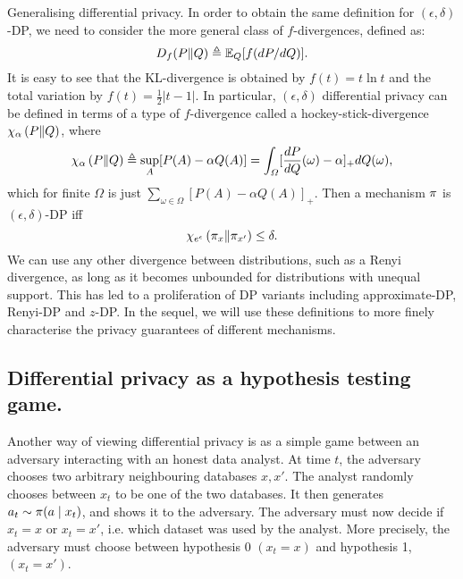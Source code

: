 {\begin{theoryblock}{Generalising differential privacy.}
    In order to obtain the same definition for $(\epsilon, \delta)$-DP, we need to consider the more general class of $f$-divergences, defined as:
    \begin{equation}
      \label{eq:f-divergence}
      D_f(P\|Q) \mathrel{\triangleq} \mathop{\mbox{\ensuremath{\mathbb{E}}}}\nolimits_Q[f(dP/dQ)].
    \end{equation}
    It is easy to see that the KL-divergence is obtained by
    $f(t) = t \ln t$ and the total variation by
    $f(t) = \frac{1}{2}|t - 1|$.  In particular, $(\epsilon, \delta)$
    differential privacy can be defined in terms of a type of
    $f$-divergence called a hockey-stick-divergence
    $\chi_{\alpha}\left(P \middle\| Q \right)$, where
    \[
      \chi_{\alpha}\left(P \middle\| Q \right) \mathrel{\triangleq} \sup_A [P(A) - \alpha Q(A)] = \int_\Omega [\frac{d P}{d Q} (\omega) - \alpha]_+ dQ(\omega),
    \]
    which for finite $\Omega$ is just $\sum_{\omega \in \Omega} [P(A) - \alpha Q(A)]_+$.
Then a mechanism $\pi$ is $(\epsilon, \delta)$-DP iff
    \begin{equation}
      \chi_{e^\epsilon}\left(\pi_x \middle\| \pi_{x'} \right)\leq \delta.
      \label{eq:divergence-DP}
    \end{equation}
    We can use any other divergence between distributions, such as a Renyi divergence, as long as it becomes unbounded for distributions with unequal support.  This has led to a proliferation of DP variants including approximate-DP, Renyi-DP and $z$-DP. In the sequel, we will use these definitions to more finely characterise the privacy guarantees of different mechanisms.
  \end{theoryblock}

}

\subsection{Differential privacy as a hypothesis testing game.}

Another way of viewing differential privacy is as a simple game
between an adversary interacting with an honest data analyst. At time
$t$, the adversary chooses two arbitrary neighbouring databases
$x, x'$. The analyst randomly chooses between $x_t$ to be one of
the two databases. It then generates $a_t \sim \pi(a \mid x_t)$,
and shows it to the adversary. The adversary must now decide if
$x_t = x$ or $x_t = x'$, i.e. which dataset was used by the
analyst. More precisely, the adversary must choose between hypothesis
0 $(x_t = x)$ and hypothesis 1, $(x_t = x')$.

